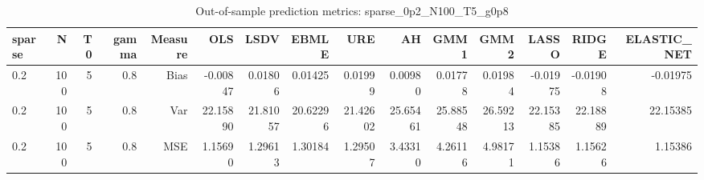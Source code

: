 \begin{table}[!htbp]\centering
\caption{Out-of-sample prediction metrics: sparse_0p2_N100_T5_g0p8}
\label{tab:table3_sparse_0p2_N100_T5_g0p8}
\begin{tabular}{lrrrrrrrrrrrrrr}
\hline
sparse & N & T0 & gamma & Measure & OLS & LSDV & EBMLE & URE & AH & GMM1 & GMM2 & LASSO & RIDGE & ELASTIC_NET \\
\hline
0.2 & 100 & 5 & 0.8 & Bias & -0.00847 & 0.01806 & 0.01425 & 0.01999 & 0.00980 & 0.01778 & 0.01984 & -0.01975 & -0.01908 & -0.01975 \\
0.2 & 100 & 5 & 0.8 & Var & 22.15890 & 21.81057 & 20.62296 & 21.42602 & 25.65461 & 25.88548 & 26.59213 & 22.15385 & 22.18889 & 22.15385 \\
0.2 & 100 & 5 & 0.8 & MSE & 1.15690 & 1.29613 & 1.30184 & 1.29507 & 3.43310 & 4.26116 & 4.98171 & 1.15386 & 1.15626 & 1.15386 \\
\hline
\end{tabular}
\end{table}

